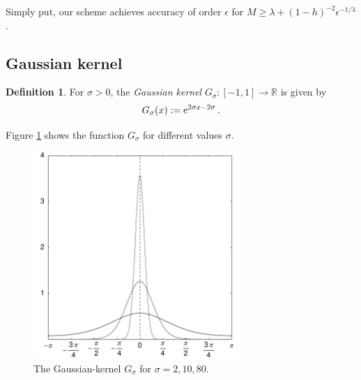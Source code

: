 \documentclass[11pt,a4paper,twoside,bibtotoc]{scrartcl}
\theoremstyle{plain}
\theoremstyle{definition}
\newtheorem{definition}[theorem]{Definition}
\theoremstyle{remark}
\newcommand{\R}{\ensuremath{\mathbb{R}}}
\newcommand{\interv}[4]{\ensuremath{\left#1\left.#2,#3\right#4\right.}}
\newcommand{\fun}[2]{\ensuremath{#1{\hspace{-0.4ex}}\left(#2\right)}}
\newcommand{\e}{\mbox{\rm{e}}}
\numberwithin{equation}{section}
\numberwithin{table}{section}
\numberwithin{figure}{section}
\begin{document}
Simply put, our scheme achieves accuracy of order $\epsilon$ for $M \ge
\lambda + (1-h)^{-2} {\epsilon}^{-1/\lambda}$.

\subsection{Gaussian kernel}
\begin{definition}
  For $\sigma>0$, the \emph{Gaussian kernel}
  $G_{\sigma}:\interv{[}{-1}{1}{]} \rightarrow \R$ is given by
  \begin{equation}
    \label{GaussKernel}
    \nonumber
    \fun{G_{\sigma}}{x} := \e^{2\sigma x-2\sigma}\,.
  \end{equation}
\end{definition}

Figure \ref{Basics:Figure:GKernel} shows the function $G_{\sigma}$ for
different values $\sigma$.
\begin{figure}[tb]
  \centering
  \includegraphics[width=0.7\textwidth]{images/gaussian}
  \caption{The Gaussian-kernel $G_{\sigma}$ for $\sigma = 2,10,80$.}
  \label{Basics:Figure:GKernel}
\end{figure}
\end{document}
